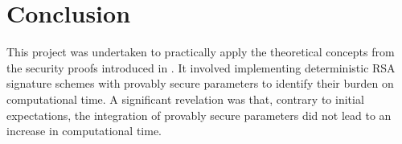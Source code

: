 \documentclass[]{final_report}
\theoremstyle{definition}
\begin{document}

\chapter{Conclusion}
This project was undertaken to practically apply the theoretical concepts from the security proofs introduced  in \cite{jager2018security}. It involved implementing deterministic RSA signature schemes with provably secure parameters to identify their burden on computational time. A significant revelation was that, contrary to initial expectations, the integration of provably secure parameters did not lead to an increase in computational time.
\end{document}
